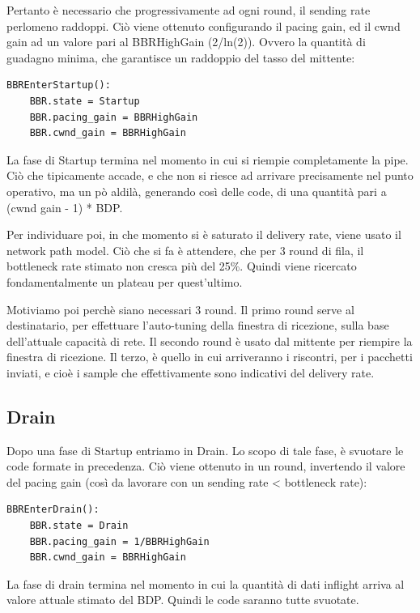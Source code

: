 Pertanto è necessario che progressivamente ad ogni round, il sending rate perlomeno raddoppi. Ciò viene ottenuto configurando il pacing gain, ed il cwnd gain ad un valore pari al BBRHighGain (2/ln(2)). Ovvero la quantità di guadagno minima, che garantisce un raddoppio del tasso del mittente:

\begin{lstlisting}[caption=BBREnterStartup]
BBREnterStartup():
	BBR.state = Startup
	BBR.pacing_gain = BBRHighGain
	BBR.cwnd_gain = BBRHighGain

\end{lstlisting}

La fase di Startup termina nel momento in cui si riempie completamente la pipe. Ciò che tipicamente accade, e che non si riesce ad arrivare precisamente nel punto operativo, ma un pò aldilà, generando così delle code, di una quantità pari a (cwnd gain - 1) * BDP. \bigskip

Per individuare poi, in che momento si è saturato il delivery rate, viene usato il network path model.
Ciò che si fa è attendere, che per 3 round di fila, il bottleneck rate stimato non cresca più del 25\%. Quindi viene ricercato fondamentalmente un plateau per quest'ultimo. \bigskip

Motiviamo poi perchè siano necessari 3 round. Il primo round serve al destinatario, per effettuare l'auto-tuning della finestra di ricezione, sulla base dell'attuale capacità di rete. Il secondo round è usato dal mittente per riempire la finestra di ricezione. Il terzo, è quello in cui arriveranno i riscontri, per i pacchetti inviati, e cioè i sample che effettivamente sono indicativi del delivery rate.

\subsection{Drain}

Dopo una fase di Startup entriamo in Drain. Lo scopo di tale fase, è svuotare le code formate in precedenza. Ciò viene ottenuto in un round, invertendo il valore del pacing gain (così da lavorare con un sending rate < bottleneck rate):

\begin{lstlisting}[caption=BBREnterDrain]
BBREnterDrain():
	BBR.state = Drain
	BBR.pacing_gain = 1/BBRHighGain
	BBR.cwnd_gain = BBRHighGain

\end{lstlisting}

La fase di drain termina nel momento in cui la quantità di dati inflight arriva al valore attuale stimato del BDP. Quindi le code saranno tutte svuotate. \bigskip

